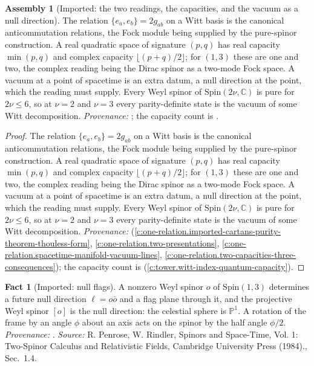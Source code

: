 \documentclass[11pt]{article}
\theoremstyle{definition}
\newtheorem{fact}[theorem]{Fact}
\newtheorem{assembled}[theorem]{Assembly}
\theoremstyle{plain}
\providecommand{\C}{}\renewcommand{\C}{\mathbb{C}}
\begin{document}
\begin{assembled}[Imported: the two readings, the capacities, and the vacuum as a null direction]\label{c:pairing.imported-two-readings-capacities-vacuum-null}
The relation $\{e_a, e_b\} = 2g_{ab}$ on a Witt basis is the canonical anticommutation relations, the Fock module being supplied by the pure-spinor construction. A real quadratic space of signature $(p,q)$ has real capacity $\min(p,q)$ and complex capacity $\lfloor (p+q)/2 \rfloor$; for $(1,3)$ these are one and two, the complex reading being the Dirac spinor as a two-mode Fock space. A vacuum at a point of spacetime is an extra datum, a null direction at the point, which the reading must supply. Every Weyl spinor of $\mathrm{Spin}(2\nu, \C)$ is pure for $2\nu \leq 6$, so at $\nu = 2$ and $\nu = 3$ every parity-definite state is the vacuum of some Witt decomposition. \emph{Provenance:} \cite[Props.~3.1, 3.2, 4.1(3), Fact~2.10]{ButlerT16}; the capacity count is \cite[Thm.~4.3]{ButlerT3}.
\end{assembled}
\begin{proof}
The relation $\{e_a, e_b\} = 2g_{ab}$ on a Witt basis is the canonical anticommutation relations, the Fock module being supplied by the pure-spinor construction. A real quadratic space of signature $(p,q)$ has real capacity $\min(p,q)$ and complex capacity $\lfloor (p+q)/2 \rfloor$; for $(1,3)$ these are one and two, the complex reading being the Dirac spinor as a two-mode Fock space. A vacuum at a point of spacetime is an extra datum, a null direction at the point, which the reading must supply. Every Weyl spinor of $\mathrm{Spin}(2\nu, \C)$ is pure for $2\nu \leq 6$, so at $\nu = 2$ and $\nu = 3$ every parity-definite state is the vacuum of some Witt decomposition. \emph{Provenance:} \cite[Props.~3.1, 3.2, 4.1(3), Fact~2.10]{ButlerT16} (\ref{c:one-relation.imported-cartans-purity-theorem-thouless-form}, \ref{c:one-relation.two-presentations}, \ref{c:one-relation.spacetime-manifold-vacuum-lines}, \ref{c:one-relation.two-capacities-three-consequences}); the capacity count is \cite[Thm.~4.3]{ButlerT3} (\ref{c:tower.witt-index-quantum-capacity}).

\end{proof}

\begin{fact}[Imported: null flags]\label{c:pairing.imported-null-flags}
A nonzero Weyl spinor $o$ of $\mathrm{Spin}(1,3)$ determines a future null direction $\ell = o\bar o$ and a flag plane through it, and the projective Weyl spinor $[o]$ is the null direction: the celestial sphere is $\mathbb{P}^1$. A rotation of the frame by an angle $\phi$ about an axis acts on the spinor by the half angle $\phi/2$. \emph{Provenance:} \cite[Sec.~1.4]{PenroseRindler1}.
\emph{Source:} R. Penrose, W. Rindler, Spinors and Space-Time, Vol. 1: Two-Spinor Calculus and Relativistic Fields, Cambridge University Press (1984)., Sec.~1.4.
\end{fact}
\end{document}
